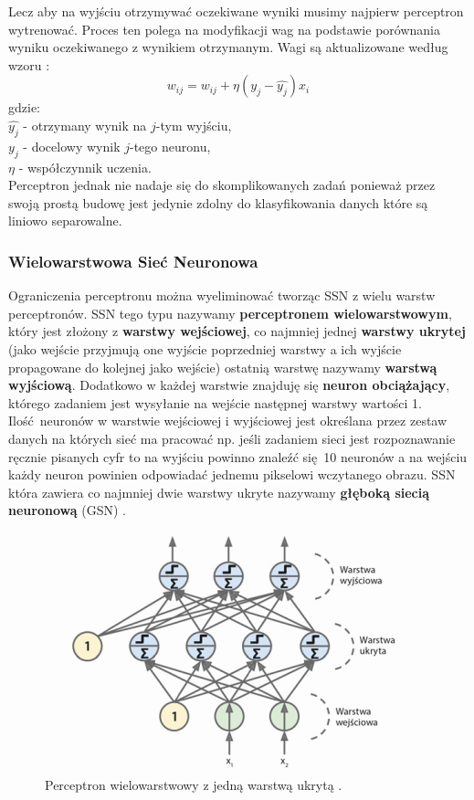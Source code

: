\documentclass{article}
\begin{document}
Lecz aby na wyjściu otrzymywać oczekiwane wyniki musimy najpierw perceptron wytrenować. Proces
ten polega na modyfikacji wag na podstawie porównania wyniku oczekiwanego z wynikiem otrzymanym.
Wagi są aktualizowane według wzoru \cite{um}:
\begin{equation}
	w_{ij} = w_{ij} + \eta(y_j - \hat{y_j})x_i
\end{equation}
gdzie:\\
$\hat{y_j}$ - otrzymany wynik na $j$-tym wyjściu,\\
$y_j$ - docelowy wynik $j$-tego neuronu,\\
$\eta$ - współczynnik uczenia.\\
Perceptron jednak nie nadaje się do skomplikowanych zadań ponieważ przez swoją prostą budowę
jest jedynie zdolny do klasyfikowania danych które są liniowo separowalne.

\subsubsection{Wielowarstwowa Sieć Neuronowa}
Ograniczenia perceptronu można wyeliminować tworząc SSN z wielu warstw perceptronów.
SSN tego typu nazywamy \textbf{perceptronem wielowarstwowym}, który jest złożony z 
\textbf{warstwy wejściowej}, co najmniej jednej \textbf{warstwy ukrytej} (jako wejście przyjmują
one wyjście poprzedniej warstwy a ich wyjście propagowane do kolejnej jako wejście) ostatnią
warstwę nazywamy \textbf{warstwą wyjściową}. Dodatkowo w każdej warstwie znajduję się 
\textbf{neuron obciążający}, którego zadaniem jest wysyłanie na wejście następnej warstwy 
wartości 1. Ilość neuronów w warstwie wejściowej i wyjściowej jest określana przez
zestaw danych na których sieć ma pracować np. jeśli zadaniem sieci jest rozpoznawanie
ręcznie pisanych cyfr to na wyjściu powinno znaleźć się 10 neuronów a na wejściu każdy neuron
powinien odpowiadać jednemu pikselowi wczytanego obrazu.
SSN która zawiera co najmniej dwie warstwy ukryte nazywamy
\textbf{głęboką siecią neuronową} (GSN) \cite{um}.

\begin{figure}[H]
\centering
\includegraphics[scale=0.5]{gsn.png}
\caption{Perceptron wielowarstwowy z jedną warstwą ukrytą \cite{um}.}
\end{figure}
\end{document}
